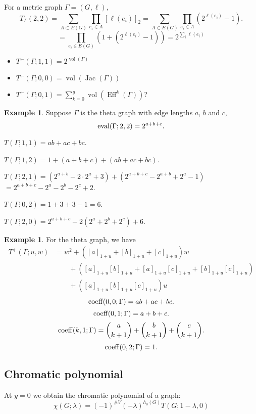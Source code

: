 \documentclass{amsart}
\theoremstyle{definition}
\newtheorem{eg}[thm]{Example}
\DeclareMathOperator{\Eff}{Eff}
\DeclareMathOperator{\Jac}{Jac}
\DeclareMathOperator{\vol}{vol}
\begin{document}
For a metric graph $\Gamma = (G,\ell)$,
\[ T_\Gamma(2,2) = \sum_{A \subset E(G)} \prod_{e_i \in A} [\ell(e_i)]_{2}
= \sum_{A \subset E(G)} \prod_{e_i \in A} (2^{\ell(e_i)} - 1) .\]
\[ = \prod_{e_i \in E(G)} (1 + (2^{\ell(e_i)} - 1))
 = 2^{\sum_i \ell(e_i)}\]
\begin{itemize}
\item 
$T^+(\Gamma;1,1) = 2^{\vol(\Gamma)}$

\item 
$T^+(\Gamma;0,0) = \vol(\Jac(\Gamma))$

\item 
$T^+(\Gamma;0,1) = \sum_{k=0}^g \vol(\Eff^k(\Gamma))$?

\end{itemize}

\begin{eg}
Suppose $\Gamma$ is the theta graph with edge lengths $a$, $b$ and $c$,
\[ {\rm eval}(\Gamma; 2,2) = 2^{a+b+c} .\]

$T(\Gamma; 1,1) = ab + ac + bc$.

$T(\Gamma; 1,2) = 1 + (a + b + c) + (ab + ac + bc)$.

$T(\Gamma; 2,1) = (2^{a+b}  -2\cdot 2^a + 3) + (2^{a+b+c}-2^{a+b} + 2^a - 1)$
$= 2^{a+b+c} - 2^a - 2^b - 2^c + 2$.

$T(\Gamma; 0,2) = 1 + 3 + 3 - 1 = 6$.

$T(\Gamma; 2,0) = 2^{a+b+c} - 2(2^a + 2^b + 2^c) + 6$.
\end{eg}

\begin{eg}
For the theta graph, we have
\begin{align*}
T^+(\Gamma; u,w) &= w^2 + ([a]_{1+u} + [b]_{1+u} + [c]_{1+u})w  \\
&\qquad + ([a]_{1+u} [b]_{1+u} + [a]_{1+u} [c]_{1+u}  + [b]_{1+u} [c]_{1+u}) \\
&\qquad + ([a]_{1+u} [b]_{1+u} [c]_{1+u})u
\end{align*}
$$ {\rm coeff}(0,0; \Gamma) = ab + ac + bc .$$
$$ {\rm coeff}(0,1; \Gamma) = a + b + c .$$
$$ {\rm coeff}(k,1; \Gamma) = \binom{a}{k+1} + \binom{b}{k+1} + \binom{c}{k+1} .$$
$$ {\rm coeff}(0,2; \Gamma) = 1 .$$

\end{eg}

\subsection{Chromatic polynomial}
At $y=0$ we obtain the chromatic polynomial of a graph:
\begin{equation*}
\chi(G; \lambda) = (-1)^{\#V } (-\lambda)^{h_0(G)} T(G; 1-\lambda,0)
\end{equation*}
\end{document}
